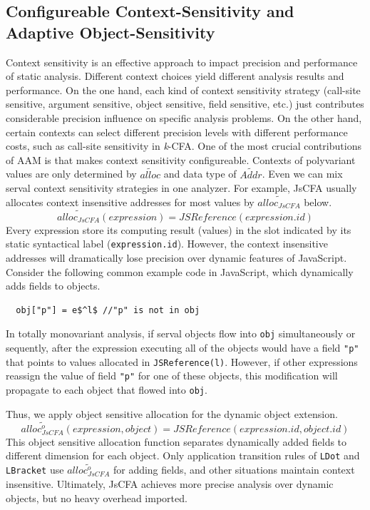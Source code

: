 \documentclass{article}
\begin{document}
\subsection{Configureable Context-Sensitivity and Adaptive Object-Sensitivity}
\label{sub:Configureable}
Context sensitivity is an effective approach to impact precision and performance of static analysis.
Different context choices yield different analysis results and performance.
On the one hand, each kind of context sensitivity strategy (call-site sensitive, argument sensitive, object sensitive, field sensitive, etc.) just contributes considerable precision influence on specific analysis problems.
On the other hand, certain contexts can select different precision levels with different performance costs, such as call-site sensitivity in \textit{k}-CFA\@.
One of the most crucial contributions of AAM is that makes context sensitivity configureable.
Contexts of polyvariant values are only determined by $\widetilde{alloc}$ and data type of $\widetilde{Addr}$. %
Even we can mix serval context sensitivity strategies in one analyzer.
For example, JsCFA usually allocates context insensitive addresses for most values by $\widetilde{alloc_{JsCFA}}$ below.
\[
\widetilde{alloc_{JsCFA}}(expression) = JSReference(expression.id)
\]
Every expression store its computing result (values) in the slot indicated by its static syntactical label (\verb|expression.id|).
However, the context insensitive addresses will dramatically lose precision over dynamic features of JavaScript.
Consider the following common example code in JavaScript, which dynamically adds fields to objects.
\lstset{mathescape}
\begin{lstlisting}
  obj["p"] = e$^l$ //"p" is not in obj
\end{lstlisting}
In totally monovariant analysis, if serval objects flow into \verb|obj| simultaneously or sequently, after the expression executing all of the objects would have a field \verb|"p"| that points to values allocated in \verb|JSReference(l)|.
However, if other expressions reassign the value of field \verb|"p"| for one of these objects, this modification will propagate to each object that flowed into \verb|obj|.

Thus, we apply object sensitive allocation for the dynamic object extension.
\[
\widetilde{alloc^{o}_{JsCFA}}(expression, object) = JSReference(expression.id, object.id)
\]
This object sensitive allocation function separates dynamically added fields to different dimension for each object. Only application transition rules of \verb|LDot| and \verb|LBracket| use $\widetilde{alloc^{o}_{JsCFA}}$ for adding fields, and other situations maintain context insensitive.
Ultimately, JsCFA achieves more precise analysis over dynamic objects, but no heavy overhead imported.
\end{document}

